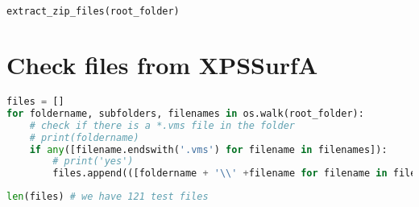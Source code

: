 \begin{lstlisting}[language=Python]
extract_zip_files(root_folder)
\end{lstlisting}

\hypertarget{check-files-from-xpssurfa}{%
\section*{Check files from XPSSurfA}\label{check-files-from-xpssurfa}}

\begin{lstlisting}[language=Python]
files = []
for foldername, subfolders, filenames in os.walk(root_folder):
    # check if there is a *.vms file in the folder
    # print(foldername)
    if any([filename.endswith('.vms') for filename in filenames]):
        # print('yes')
        files.append(([foldername + '\\' +filename for filename in filenames if filename.endswith('.vms')][0]))
\end{lstlisting}

\begin{lstlisting}[language=Python]
len(files) # we have 121 test files
\end{lstlisting}
